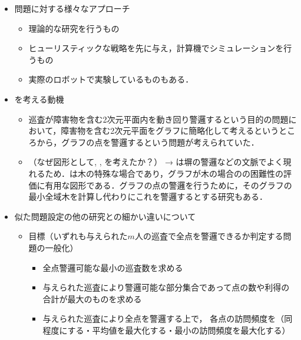 \begin{itemize}
  \item 問題に対する様々なアプローチ
  \begin{itemize}
    \item 理論的な研究を行うもの\cite{}
    \item ヒューリスティックな戦略を先に与え，計算機でシミュレーションを行うもの\cite{}
    \item 実際のロボットで実験しているものもある\cite{}．
  \end{itemize}

  \item {\patProb}を考える動機
  \begin{itemize}
    \item 巡査が障害物を含む2次元平面内を動き回り警邏するという目的の問題において，障害物を含む2次元平面をグラフに簡略化して考えるというところから，グラフの点を警邏するという問題が考えられていた\cite{machado2002multi}．
    \item （なぜ図形として{\graphLine}, {\graphStar}, {\graphUnit}を考えたか？）
    → {\graphLine}は塀の警邏などの文脈でよく現れるため\cite{}．{\graphStar}は木の特殊な場合であり，グラフが木の場合の{\patProb}の困難性の評価に有用な図形である．グラフの点の警邏を行うために，そのグラフの最小全域木を計算し代わりにこれを警邏するとする研究もある\cite{}．
  \end{itemize}

  \item 似た問題設定の他の研究との細かい違いについて
  \begin{itemize}
    \item 目標（いずれも与えられた$m$人の巡査で全点を警邏できるか判定する問題の一般化）
    \begin{itemize}
      \item 全点警邏可能な最小の巡査数を求める\cite{} \cite{GORAIN2015712}
      \item 与えられた巡査により警邏可能な部分集合であって点の数や利得の合計が最大のものを求める\cite{}
      \item 与えられた巡査により全点を警邏する上で，
      各点の訪問頻度を（同程度にする・平均値を最大化する・最小の訪問頻度を最大化する）\cite{}
    \end{itemize}
  \end{itemize}



\end{itemize}
